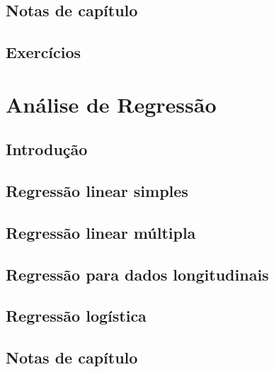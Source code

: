 \documentclass[
]{latex/krantz}
\theoremstyle{definition}
\theoremstyle{definition}
\theoremstyle{definition}
\theoremstyle{definition}
\theoremstyle{remark}
\begin{document}
\hypertarget{notas-de-capuxedtulo-3}{%
\section{Notas de capítulo}\label{notas-de-capuxedtulo-3}}

\hypertarget{exercuxedcios-3}{%
\section{Exercícios}\label{exercuxedcios-3}}

\hypertarget{anuxe1lise-de-regressuxe3o}{%
\chapter{Análise de Regressão}\label{anuxe1lise-de-regressuxe3o}}

\hypertarget{introduuxe7uxe3o-4}{%
\section{Introdução}\label{introduuxe7uxe3o-4}}

\hypertarget{regressuxe3o-linear-simples}{%
\section{Regressão linear simples}\label{regressuxe3o-linear-simples}}

\hypertarget{regressuxe3o-linear-muxfaltipla}{%
\section{Regressão linear múltipla}\label{regressuxe3o-linear-muxfaltipla}}

\hypertarget{regressuxe3o-para-dados-longitudinais}{%
\section{Regressão para dados longitudinais}\label{regressuxe3o-para-dados-longitudinais}}

\hypertarget{regressuxe3o-loguxedstica}{%
\section{Regressão logística}\label{regressuxe3o-loguxedstica}}

\hypertarget{notas-de-capuxedtulo-4}{%
\section{Notas de capítulo}\label{notas-de-capuxedtulo-4}}
\end{document}
